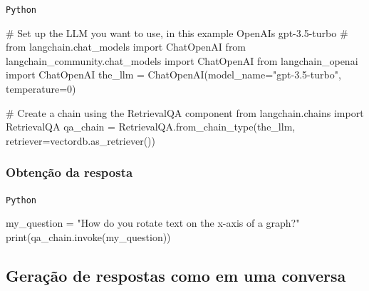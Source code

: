 \documentclass[
  letterpaper,
  DIV=11,
  numbers=noendperiod]{scrartcl}
\newenvironment{Shaded}{\begin{snugshade}}{\end{snugshade}}
\newcommand{\BuiltInTok}[1]{\textcolor[rgb]{0.00,0.23,0.31}{#1}}
\newcommand{\CommentTok}[1]{\textcolor[rgb]{0.37,0.37,0.37}{#1}}
\newcommand{\DecValTok}[1]{\textcolor[rgb]{0.68,0.00,0.00}{#1}}
\newcommand{\ImportTok}[1]{\textcolor[rgb]{0.00,0.46,0.62}{#1}}
\newcommand{\NormalTok}[1]{\textcolor[rgb]{0.00,0.23,0.31}{#1}}
\newcommand{\OperatorTok}[1]{\textcolor[rgb]{0.37,0.37,0.37}{#1}}
\newcommand{\StringTok}[1]{\textcolor[rgb]{0.13,0.47,0.30}{#1}}
\begin{document}
\begin{codelisting}

\caption{\texttt{Python}}

\begin{Shaded}
\begin{Highlighting}[]
\CommentTok{\# Set up the LLM you want to use, in this example OpenAI\textquotesingle{}s gpt{-}3.5{-}turbo}
\CommentTok{\# from langchain.chat\_models import ChatOpenAI}
\ImportTok{from}\NormalTok{ langchain\_community.chat\_models }\ImportTok{import}\NormalTok{ ChatOpenAI}
\ImportTok{from}\NormalTok{ langchain\_openai }\ImportTok{import}\NormalTok{ ChatOpenAI}
\NormalTok{the\_llm }\OperatorTok{=}\NormalTok{ ChatOpenAI(model\_name}\OperatorTok{=}\StringTok{"gpt{-}3.5{-}turbo"}\NormalTok{, temperature}\OperatorTok{=}\DecValTok{0}\NormalTok{)}

\CommentTok{\# Create a chain using the RetrievalQA component}
\ImportTok{from}\NormalTok{ langchain.chains }\ImportTok{import}\NormalTok{ RetrievalQA}
\NormalTok{qa\_chain }\OperatorTok{=}\NormalTok{ RetrievalQA.from\_chain\_type(the\_llm, retriever}\OperatorTok{=}\NormalTok{vectordb.as\_retriever())}
\end{Highlighting}
\end{Shaded}

\end{codelisting}

\hypertarget{obtenuxe7uxe3o-da-resposta}{%
\subsubsection{Obtenção da resposta}\label{obtenuxe7uxe3o-da-resposta}}

\begin{codelisting}

\caption{\texttt{Python}}

\begin{Shaded}
\begin{Highlighting}[]
\NormalTok{my\_question }\OperatorTok{=} \StringTok{"How do you rotate text on the x{-}axis of a graph?"}
\BuiltInTok{print}\NormalTok{(qa\_chain.invoke(my\_question))}
\end{Highlighting}
\end{Shaded}

\end{codelisting}

\hypertarget{gerauxe7uxe3o-de-respostas-como-em-uma-conversa}{%
\subsection{Geração de respostas como em uma
conversa}\label{gerauxe7uxe3o-de-respostas-como-em-uma-conversa}}
\end{document}
